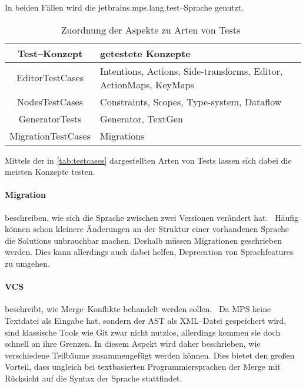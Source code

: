 In beiden Fällen wird die {\ttfamily jetbrains.mps.lang.test}--Sprache genutzt.
\begin{table}[ht]
    \centering
    \begin{tabular}{|c|p{\textwidth-5cm}|}
        \hline
        \textbf{Test--Konzept}    & \textbf{getestete Konzepte}                                       \\
        \hline
        \hline
        {\ttfamily EditorTestCases}    & Intentions, Actions, Side-transforms, Editor, ActionMaps, KeyMaps \\
        \hline
        {\ttfamily NodesTestCases}     & Constraints, Scopes, Type-system, Dataflow                        \\
        \hline
        {\ttfamily GeneratorTests}     & Generator, TextGen                                                \\
        \hline
        {\ttfamily MigrationTestCases} & Migrations                                                        \\
        \hline
    \end{tabular}
    \caption{Zuordnung der Aspekte zu Arten von Tests~\autocite{jetbrains-sro-no-dateE}}
    \label{tab:testcases}
\end{table}
Mittels der in \autoref{tab:testcases} dargestellten Arten von Tests lassen sich dabei die meisten Konzepte testen.

\paragraph{Migration} beschreiben, wie sich die Sprache zwischen zwei Versionen verändert hat.~\autocite{jetbrains-sro-no-dateV}
Häufig können schon kleinere Änderungen an der Struktur einer vorhandenen Sprache die Solutions unbrauchbar machen.
Deshalb müssen Migrationen geschrieben werden.
Dies kann allerdings auch dabei helfen, Deprecation von Sprachfeatures zu umgehen.

\paragraph{\ac{VCS}} beschreibt, wie Merge--Konflikte behandelt werden sollen.~\autocite{jetbrains-sro-no-dateW}
Da \ac{MPS} keine Textdatei als Eingabe hat, sondern der \ac{AST} als \acs{XML}--Datei gespeichert wird, sind klassische Tools wie Git zwar nicht nutzlos, allerdings kommen sie doch schnell an ihre Grenzen.
In diesem Aspekt wird daher beschrieben, wie verschiedene Teilbäume zusammengefügt werden können.
Dies bietet den großen Vorteil, dass ungleich bei textbasierten Programmiersprachen der Merge mit Rücksicht auf die Syntax der Sprache stattfindet.

